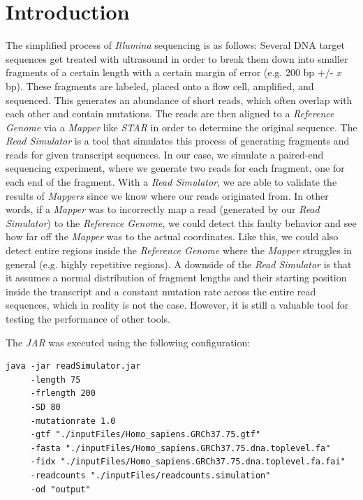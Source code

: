 \documentclass[12pt]{article}
\begin{document}
\section{Introduction}\label{sec:intro}
The simplified process of \textit{Illumina} sequencing is as follows:
Several DNA target sequences get treated with ultrasound
in order to break them down into smaller fragments of a certain length with a certain margin of error (e.g. 200 bp +/- $x$ bp).
These fragments are labeled, placed onto a flow cell, amplified, and sequenced.
This generates an abundance of short reads, which often overlap with each other and contain mutations.
The reads are then aligned to a \textit{Reference Genome} via a \textit{Mapper} like \textit{STAR} in order to determine the original sequence.
The \textit{Read Simulator} is a tool that simulates this process of generating fragments and reads for given transcript sequences.
In our case, we simulate a paired-end sequencing experiment, where we generate two reads for each fragment, one for each end of the fragment.
With a \textit{Read Simulator}, we are able to validate the results of \textit{Mappers} since we know where our reads originated from.
In other words, if a \textit{Mapper} was to incorrectly map a read (generated by our \textit{Read Simulator}) to the \textit{Reference Genome},
we could detect this faulty behavior and see how far off the \textit{Mapper} was to the actual coordinates.
Like this, we could also detect entire regions inside the \textit{Reference Genome} where the \textit{Mapper} struggles in general (e.g. highly repetitive regions).
A downside of the \textit{Read Simulator} is that it assumes a normal distribution of fragment lengths and
their starting position inside the transcript
and a constant mutation rate across the entire read sequences, which in reality is not the case.
However, it is still a valuable tool for testing the performance of other tools.

The \textit{JAR} was executed using the following configuration:
\begin{verbatim}
java -jar readSimulator.jar 
     -length 75 
     -frlength 200
     -SD 80 
     -mutationrate 1.0 
     -gtf "./inputFiles/Homo_sapiens.GRCh37.75.gtf" 
     -fasta "./inputFiles/Homo_sapiens.GRCh37.75.dna.toplevel.fa" 
     -fidx "./inputFiles/Homo_sapiens.GRCh37.75.dna.toplevel.fa.fai" 
     -readcounts "./inputFiles/readcounts.simulation" 
     -od "output"
    \end{verbatim}
\end{document}
